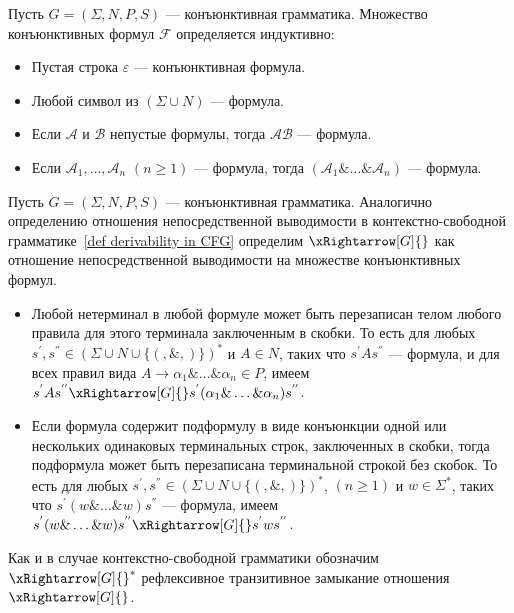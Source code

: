 \begin{definition}\label{Definition of conjunctive formula}
    Пусть $G = (\Sigma,N,P,S)$ --- конъюнктивная грамматика. Множество конъюнктивных формул $ \mathcal{F}$ определяется индуктивно:
    \begin{itemize}
        \item Пустая строка $\varepsilon$ --- конъюнктивная формула. 
        \item Любой символ из $(\Sigma \cup N)$ --- формула.
        \item Если $\mathcal{A}$ и $\mathcal{B}$ непустые формулы, тогда $\mathcal{AB}$ --- формула.
        \item Если $\mathcal{A}_1,\ldots,\mathcal{A}_n$ $(n \geqslant 1)$ --- формула, тогда $(\mathcal{A}_1\&\ldots\&\mathcal{A}_n)$ --- формула.
    \end{itemize}
\end{definition}

\begin{definition}
    Пусть $G = (\Sigma,N,P,S)$ --- конъюнктивная грамматика. Аналогично определению отношения непосредственной выводимости в контекстно-свободной грамматике~\ref{def derivability in CFG} определим $\xRightarrow[G]{}$ как отношение непосредственной выводимости на множестве конъюнктивных формул.
    \begin{itemize}
        \item Любой нетерминал в любой формуле может быть перезаписан телом любого правила для этого терминала заключенным в скобки. То есть для любых $s^{'},s^{''} \in (\Sigma \cup N \cup \{(, \&, )\})^*$ и $A\in N$, таких что $s^{'}As^{''}$ --- формула, и для всех правил вида $A \rightarrow \alpha_1\&\ldots\&\alpha_n \in P$, имеем $s^{'}As^{''}\xRightarrow[G]{}s^{'}(\alpha_1\&\ldots\&\alpha_n)s^{''}$. 
        \item Если формула содержит подформулу в виде конъюнкции одной или нескольких одинаковых терминальных строк, заключенных в скобки, тогда подформула может быть перезаписана терминальной строкой без скобок. То есть для любых $s^{'},s^{''} \in (\Sigma \cup N \cup \{(, \&, )\})^*$, $(n \geqslant 1)$ и $w \in \Sigma^*$, таких что $s^{'}(w\&\ldots\&w)s^{''}$ --- формула, имеем $s^{'}(w\&\ldots\&w)s^{''}\xRightarrow[G]{}s^{'}ws^{''}$.
    \end{itemize}
    Как и в случае контекстно-свободной грамматики обозначим $\xRightarrow[G]{}^*$ рефлексивное транзитивное замыкание отношения $\xRightarrow[G]{}$.
\end{definition}

